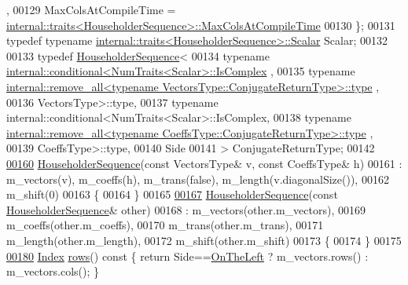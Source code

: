 \begin{DoxyCode}
      ,
00129       MaxColsAtCompileTime = 
      \hyperlink{struct_eigen_1_1internal_1_1traits}{internal::traits<HouseholderSequence>::MaxColsAtCompileTime}
00130     \};
00131     \textcolor{keyword}{typedef} \textcolor{keyword}{typename} \hyperlink{struct_eigen_1_1internal_1_1traits}{internal::traits<HouseholderSequence>::Scalar}
       Scalar;
00132 
00133     \textcolor{keyword}{typedef} \hyperlink{group___householder___module_class_eigen_1_1_householder_sequence}{HouseholderSequence}<
00134       \textcolor{keyword}{typename} \hyperlink{struct_eigen_1_1internal_1_1conditional}{internal::conditional<NumTraits<Scalar>::IsComplex}
      ,
00135         \textcolor{keyword}{typename} 
      \hyperlink{group___sparse_core___module}{internal::remove\_all<typename VectorsType::ConjugateReturnType>::type}
      ,
00136         VectorsType>::type,
00137       \textcolor{keyword}{typename} internal::conditional<NumTraits<Scalar>::IsComplex,
00138         \textcolor{keyword}{typename} 
      \hyperlink{group___sparse_core___module}{internal::remove\_all<typename CoeffsType::ConjugateReturnType>::type}
      ,
00139         CoeffsType>::type,
00140       Side
00141     > ConjugateReturnType;
00142 
\hyperlink{group___householder___module_af6aeede87ed8dac452f4fa8b4f45c3f2}{00160}     \hyperlink{group___householder___module_af6aeede87ed8dac452f4fa8b4f45c3f2}{HouseholderSequence}(\textcolor{keyword}{const} VectorsType& v, \textcolor{keyword}{const} CoeffsType& h)
00161       : m\_vectors(v), m\_coeffs(h), m\_trans(false), m\_length(v.diagonalSize()),
00162         m\_shift(0)
00163     \{
00164     \}
00165 
\hyperlink{group___householder___module_aa4b1b93fff4d5c79342974d9d2a9eec8}{00167}     \hyperlink{group___householder___module_aa4b1b93fff4d5c79342974d9d2a9eec8}{HouseholderSequence}(\textcolor{keyword}{const} \hyperlink{group___householder___module_class_eigen_1_1_householder_sequence}{HouseholderSequence}& other)
00168       : m\_vectors(other.m\_vectors),
00169         m\_coeffs(other.m\_coeffs),
00170         m\_trans(other.m\_trans),
00171         m\_length(other.m\_length),
00172         m\_shift(other.m\_shift)
00173     \{
00174     \}
00175 
\hyperlink{group___householder___module_a6eaafe2460930d1f4aa67d6e577b71f0}{00180}     \hyperlink{group___core___module_a554f30542cc2316add4b1ea0a492ff02}{Index} \hyperlink{group___householder___module_a6eaafe2460930d1f4aa67d6e577b71f0}{rows}()\textcolor{keyword}{ const }\{ \textcolor{keywordflow}{return} Side==\hyperlink{group__enums_ggac22de43beeac7a78b384f99bed5cee0ba129609b3bdf23b071f5f86cf2f995ec4}{OnTheLeft} ? m\_vectors.rows() : m\_vectors.cols(); \}

\end{DoxyCode}

